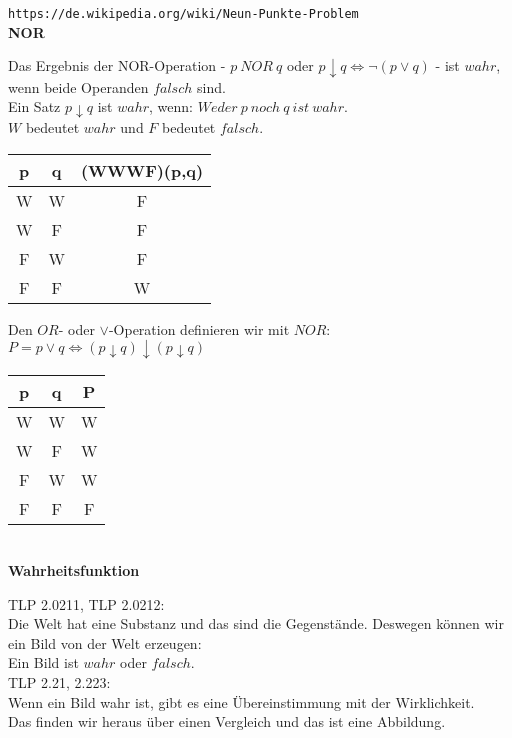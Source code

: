 \documentclass[10pt,a4paper]{article}
\begin{document}
\verb+https://de.wikipedia.org/wiki/Neun-Punkte-Problem+ \\

\vskip 4pt
{\bf NOR}
\vskip 8pt

Das Ergebnis der {NOR-Operation} -
$p\ NOR\ q$ oder $p \downarrow q \Leftrightarrow \neg (p \vee q)$ - ist $wahr$,
wenn beide Operanden $falsch$ sind. \\

Ein Satz $p \downarrow q$ ist $wahr$, wenn: $Weder\ p\ noch\ q\ ist\ wahr$. \\

$W$ bedeutet $wahr$ und $F$ bedeutet $falsch$. \\

\begin{tabular}{|c|c|c|}
  \hline
  \rowcolor{eggshell} \textbf{p} & \textbf{q} & \textbf{(WWWF)(p,q)} \\
  \hline
  W & W & F \\
  W & F & F \\
  F & W & F \\
  F & F & W \\
  \hline
\end{tabular}

\vskip 12pt
Den $OR$- oder $\vee$-Operation definieren wir mit $NOR$: \\
$P = p \vee q \Leftrightarrow (p \downarrow q) \downarrow (p \downarrow q)$
\\

\begin{tabular}{|c|c|c|}
  \hline
  \rowcolor{eggshell} \textbf{p} & \textbf{q} & \textbf{P} \\
  \hline
  W & W & W \\
  W & F & W \\
  F & W & W \\
  F & F & F \\
  \hline
\end{tabular}
\\

\vskip 8pt
{\bf Wahrheitsfunktion}
\vskip 8pt

TLP 2.0211, TLP 2.0212: \\
Die Welt hat eine Substanz und das sind die Gegenstände. Deswegen können wir ein
Bild von der Welt erzeugen: \\
 
Ein Bild ist $wahr$ oder $falsch$. \\

TLP 2.21, 2.223: \\
Wenn ein Bild wahr ist, gibt es eine Übereinstimmung mit der Wirklichkeit. \\
Das finden wir heraus über einen Vergleich und das ist eine Abbildung. \\
\end{document}

